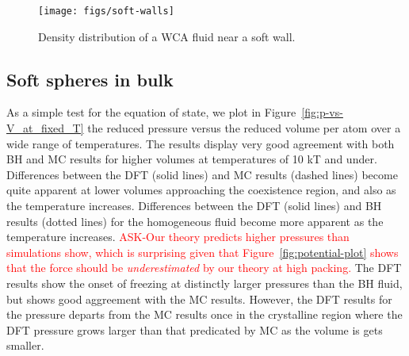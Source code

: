 \documentclass[letterpaper,twocolumn,amsmath,amssymb,prb]{revtex4-1}
\begin{document}
\begin{figure}
  \centering
  \texttt{[image: figs/soft-walls]}
  \caption{Density distribution of a WCA fluid near a soft wall.}
  \label{fig:soft-walls}
\end{figure}

\subsection{Soft spheres in bulk}

As a simple test for the equation of state, we plot in Figure~\ref{fig:p-vs-V_at_fixed_T} the 
reduced pressure versus the reduced volume per atom 
over a wide range of temperatures.
%
%
The results
display very good agreement with both BH and MC results
for higher volumes at temperatures of 10 kT and under. 
Differences between the DFT (solid lines) and MC results (dashed lines) 
become quite apparent at lower volumes approaching the coexistence region,
and also as the temperature increases. 
Differences between the DFT (solid lines) and BH results (dotted lines) 
for the homogeneous fluid become more apparent as the temperature increases.
\textcolor{red}{ASK-Our theory %
predicts higher pressures than
simulations show, which is surprising given that
Figure~\ref{fig:potential-plot} shows that the force should be
\emph{underestimated} by our theory at high packing.} 
The DFT results show the onset of freezing at distinctly larger 
pressures than the BH fluid, but shows good aggreement with the MC results.
However, the DFT results for the pressure departs from the MC results 
once in the crystalline region where the DFT pressure grows larger than 
that predicated by MC as the volume is gets smaller.
\end{document}
